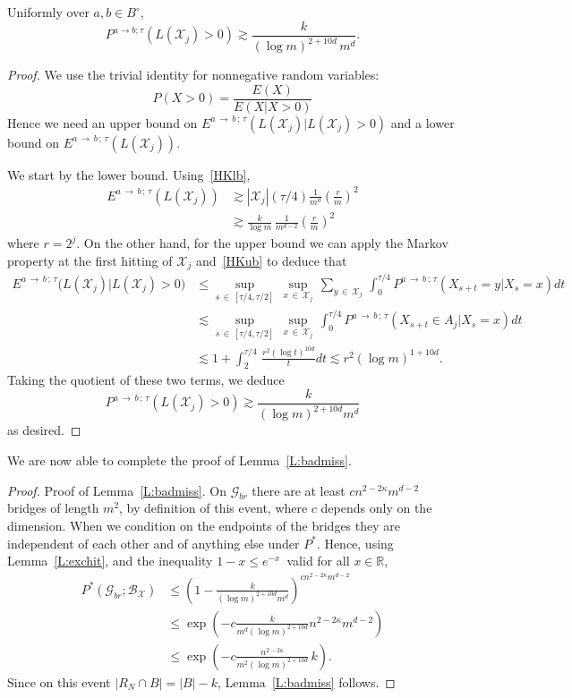 \documentclass[AHL, Unicode, longabstracts, published]{cedram}
\newcommand*\R{\mathbb{R}}
\newcommand{\Pmh}{P}
\newcommand*\E {{E}}
\newcommand{\cB}{\mathcal{B}}
\newcommand{\cG}{\mathcal{G}}
\newcommand{\cX}{\mathcal{X}}
\begin{document}
\begin{lemm}\label{L:exchit}
Uniformly over $a, b \in B^\circ$,
\[
\Pmh^{a \to b; \tau} (L (\cX_j) >0) \gtrsim \frac{k}{ (\log m)^{2 + 10d}\,m^d}.
\]
\end{lemm}

\begin{proof}
We use the trivial identity for nonnegative random variables:
\[
\Pmh(X>0) = \frac{ \E(X)}{\E(X|X>0)}
\]
Hence we need an upper bound on $\E^{a\,\to\, b\,;\,\tau} (L (\cX_j) | L(\cX_j) >0)$ and a lower bound on $\E^{a\,\to\,b\,;\,\tau} (L (\cX_j))$.

We start by the lower bound. Using~\eqref{HKlb},
\begin{align*}
\E^{a\,\to\,b\,;\,\tau} (L (\cX_j)) & \gtrsim |\cX_j| (\tau/4) \frac1{m^d} \left(\frac{r}{m}\right)^2\\
& \gtrsim \frac{k}{\log m}\,\frac{1}{m^{d-2}} \left(\frac{r}{m}\right)^2
\end{align*}
where $r = 2^j$. On the other hand, for the upper bound we can apply the Markov property at the first hitting of $\cX_j$ and~\eqref{HKub} to deduce that
\begin{align*}
\E^{a\,\to\,b\,;\,\tau} \big(L (\cX_j) | L(\cX_j) >0\big) & \le \sup_{s\,\in\,[\tau/4,\tau/2]}\,\sup_{x\,\in\,\cX_{j}}\,\sum_{y\,\in\,\cX_j}\,\int_0^{ \tau/4}\Pmh^{a\,\to\,b\,;\,\tau}(X_{s+t} = y | X_s=x) dt\\
& \lesssim \sup_{s\,\in\,[\tau/4,\tau/2]}\, \sup_{x\,\in\,\cX_{j}}\,\int_0^{ \tau/4} \Pmh^{a\,\to\,b\,;\,\tau} (X_{s+t} \in A_j | X_s = x) dt\\
& \lesssim 1+ \int_2^{ \tau / 4}\,\frac{r^2 (\log t)^{10 d}}{t} dt \lesssim r^2 (\log m)^{1+ 10 d}.
\end{align*}
Taking the quotient of these two terms, we deduce
\[
\Pmh^{a\,\to\,b\,;\,\tau} (L (\cX_j) >0) \gtrsim \frac{k}{ (\log m)^{2+ 10 d} m^d}
\]
as desired.
\end{proof}

We are now able to complete the proof of Lemma~\ref{L:badmiss}.

\goodbreak
\begin{proof}{Proof of Lemma~\ref{L:badmiss}.}
On $\cG_{br}$ there are at least $c n^{2- 2 \kappa} m^{d-2}$ bridges of length $m^2$, by definition of this event, where $c$ depends only on the dimension. When we condition on the endpoints of the bridges they are independent of each other and of anything else under $\Pmh^*$. Hence, using Lemma~\ref{L:exchit}, and the inequality $1- x \le e^{-x}$~valid for all $x \in \R$,
\begin{align*}
\Pmh^*\left(\cG_{br}; \cB_{\cX}\right) &\le \left(1-\tfrac{k}{ (\log m)^{2+ 10d} m^d}\right)^{c n^{2- 2\kappa} m^{d-2}}\\
& \le \exp\left(- c \tfrac{k}{m^d (\log m)^{2+ 10d}} n^{2 - 2\kappa} m^{d-2}\right)\\
& \le \exp\left(- c \tfrac{n^{2 - 2 \kappa}}{m^2 (\log m)^{2+ 10d}}\,k\right).
\end{align*}
Since on this event $|R_N \cap B| = |B|- k$, Lemma~\ref{L:badmiss} follows.
\end{proof}
\end{document}
